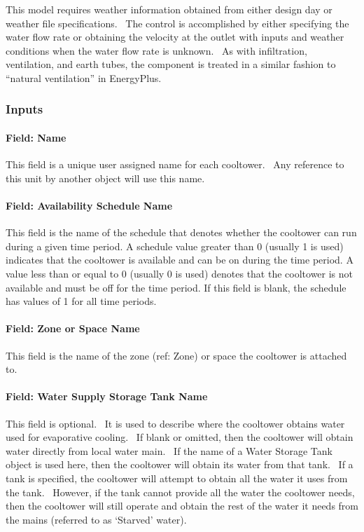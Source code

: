 This model requires weather information obtained from either design day or weather file specifications. ~The control is accomplished by either specifying the water flow rate or obtaining the velocity at the outlet with inputs and weather conditions when the water flow rate is unknown.~ As with infiltration, ventilation, and earth tubes, the component is treated in a similar fashion to ``natural ventilation'' in EnergyPlus.

\subsubsection{Inputs}\label{inputs-8-002}

\paragraph{Field: Name}\label{field-name-8-002}

This field is a unique user assigned name for each cooltower.~ Any reference to this unit by another object will use this name.

\paragraph{Field: Availability Schedule Name}\label{field-availability-schedule-name-000}

This field is the name of the schedule that denotes whether the cooltower can run during a given time period. A schedule value greater than 0 (usually 1 is used) indicates that the cooltower is available and can be on during the time period. A value less than or equal to 0 (usually 0 is used) denotes that the cooltower is not available and must be off for the time period. If this field is blank, the schedule has values of 1 for all time periods.

\paragraph{Field: Zone or Space Name}\label{field-zone-name-6}

This field is the name of the zone (ref: Zone) or space the cooltower is attached to.

\paragraph{Field: Water Supply Storage Tank Name}\label{field-water-supply-storage-tank-name}

This field is optional. ~It is used to describe where the cooltower obtains water used for evaporative cooling. ~If blank or omitted, then the cooltower will obtain water directly from local water main. ~If the name of a Water Storage Tank object is used here, then the cooltower will obtain its water from that tank. ~If a tank is specified, the cooltower will attempt to obtain all the water it uses from the tank. ~However, if the tank cannot provide all the water the cooltower needs, then the cooltower will still operate and obtain the rest of the water it needs from the mains (referred to as `Starved' water).

